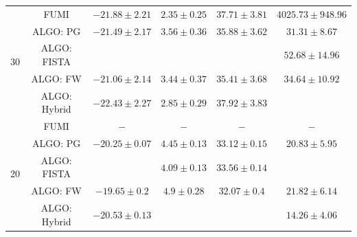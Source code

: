 \begin{table}[h]
{\begin{threeparttable}
\begin{tabular}{|c|c|c|c|c|c|}
\multirow{5}{*}{30} & FUMI                   &                    {$-21.88\pm 2.21$} &                    {$2.35\pm 0.25$} &                    {$37.71\pm 3.81$} &                    {$4025.73\pm 948.96$} \tabularnewline
                    & ALGO: PG               &                    {$-21.49\pm 2.17$} &                    {$3.56\pm 0.36$} &                    {$35.88\pm 3.62$} &                    {$31.31\pm 8.67$}     \tabularnewline
                    & ALGO: FISTA            & \cellcolor{red! 10}{$-23.44\pm 2.37$} & \cellcolor{red! 10}{$2.26\pm 0.23$} & \cellcolor{red! 10}{$39.71\pm 4.01$} &                    {$52.68\pm 14.96$}    \tabularnewline
                    & ALGO: FW               &                    {$-21.06\pm 2.14$} &                    {$3.44\pm 0.37$} &                    {$35.41\pm 3.68$} &                    {$34.64\pm 10.92$}    \tabularnewline
                    & ALGO: Hybrid \tnote{1} &                    {$-22.43\pm 2.27$} &                    {$2.85\pm 0.29$} &                    {$37.92\pm 3.83$} & \cellcolor{red! 10}{$26.93\pm 9.58$}     \tabularnewline \hline \hline
\multirow{5}{*}{20} & FUMI\tnote{2}          & $-$                 & $-$                                 & $-$                                  & $-$                                      \tabularnewline
                    & ALGO: PG               &                    {$-20.25\pm 0.07$} &                    {$4.45\pm 0.13$} &                    {$33.12\pm 0.15$} &                    {$20.83\pm 5.95$}     \tabularnewline
                    & ALGO: FISTA            & \cellcolor{red! 10}{$-20.55\pm 0.07$} &                    {$4.09\pm 0.13$} &                    {$33.56\pm 0.14$} & \cellcolor{red! 10}{$13.21\pm 3.64$}     \tabularnewline
                    & ALGO: FW               &                    {$-19.65\pm 0.2$}  &                    {$4.9\pm 0.28$}  &                    {$32.07\pm 0.4$}  &                    {$21.82\pm 6.14$}     \tabularnewline
                    & ALGO: Hybrid \tnote{1} &                    {$-20.53\pm 0.13$} & \cellcolor{red! 10}{$3.92\pm 0.09$} & \cellcolor{red! 10}{$33.66\pm 0.31$} &                    {$14.26\pm 4.06$}     \tabularnewline \hline

\end{tabular}
\end{threeparttable}}
\end{table}
